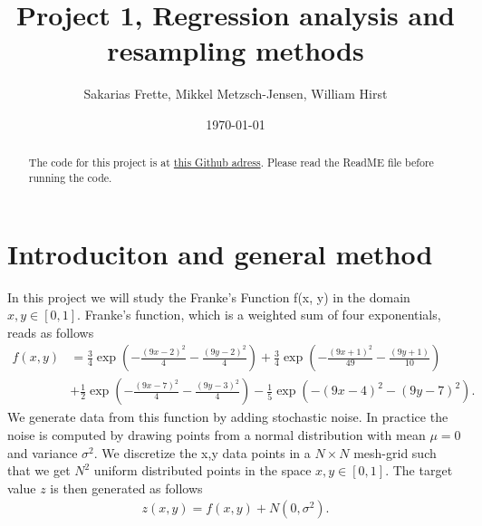 \documentclass[norsk,a4paper,12pt]{scrartcl}
\begin{document}
\title{Project 1, Regression analysis and resampling methods}
\date{\today}

\author{Sakarias Frette, Mikkel Metzsch-Jensen, William Hirst}
\maketitle
\begin{abstract}
    The code for this project is at \href{https://github.com/Gadangadang/Fys-Stk4155/tree/main/Project\%201}{this Github adress}. Please read the ReadME file before running the code.
\end{abstract}

\newpage

\tableofcontents

\newpage
\section{Introduciton and general method}
In this project we will study the Franke's Function f(x, y) in the domain $x,y \in [0,1]$. Franke's function, which is a weighted sum of four exponentials, reads as follows
\begin{align*}
f(x,y) &= \frac{3}{4}\exp{\left(-\frac{(9x-2)^2}{4} - \frac{(9y-2)^2}{4}\right)}+\frac{3}{4}\exp{\left(-\frac{(9x+1)^2}{49}- \frac{(9y+1)}{10}\right)} \\
&+\frac{1}{2}\exp{\left(-\frac{(9x-7)^2}{4} - \frac{(9y-3)^2}{4}\right)} -\frac{1}{5}\exp{\left(-(9x-4)^2 - (9y-7)^2\right) }.
\end{align*}
We generate data from this function by adding stochastic noise. In practice the noise is computed by drawing points from a normal distribution with mean $\mu=0$ and variance $\sigma^2$. We discretize the x,y data points in a $N \times N$ mesh-grid such that we get $N^2$ uniform distributed points in the space $x,y \in [0,1]$. The target value $z$ is then generated as follows
\begin{align*}
    z(x,y) = f(x,y) + N(0,\sigma^2).
\end{align*}
\end{document}
